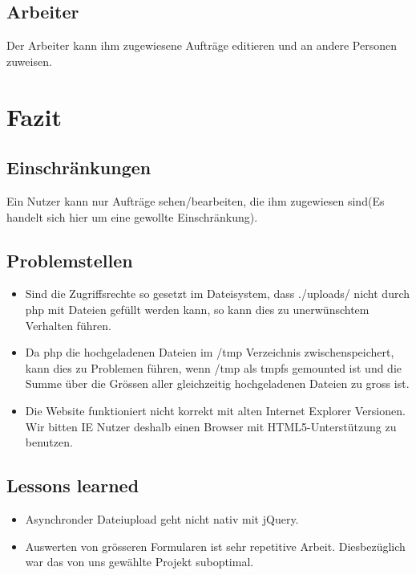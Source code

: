 \documentclass[ngerman, 12pt, pdftex]{scrartcl}[2006/07/30]
\begin{document}

\subsection{Arbeiter}
Der Arbeiter kann ihm zugewiesene Aufträge editieren und an andere Personen zuweisen.


\section{Fazit}
\subsection{Einschränkungen}

Ein Nutzer kann nur Aufträge sehen/bearbeiten, die ihm zugewiesen sind(Es handelt sich hier um eine gewollte Einschränkung).
\subsection{Problemstellen}
\begin{itemize}
\item Sind die Zugriffsrechte so gesetzt im Dateisystem, dass ./uploads/ nicht durch php mit Dateien gefüllt werden kann, so kann dies zu unerwünschtem Verhalten führen.
\item Da php die hochgeladenen Dateien im /tmp Verzeichnis zwischenspeichert, kann dies zu Problemen führen, wenn /tmp als tmpfs gemounted ist und die Summe über die Grössen aller gleichzeitig hochgeladenen Dateien zu gross ist.
\item Die Website funktioniert nicht korrekt mit alten Internet Explorer Versionen. Wir bitten IE Nutzer deshalb einen Browser mit HTML5-Unterstützung zu benutzen.
\end{itemize}
\subsection{Lessons learned}
\begin{itemize}
\item Asynchronder Dateiupload geht nicht nativ mit jQuery.
\item Auswerten von grösseren Formularen ist sehr repetitive Arbeit. Diesbezüglich war das von uns gewählte Projekt suboptimal.
\end{itemize}


\end{document}
